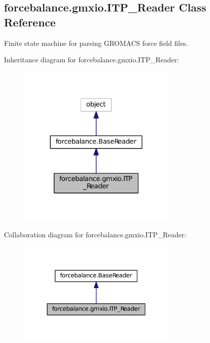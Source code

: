 \hypertarget{classforcebalance_1_1gmxio_1_1ITP__Reader}{\subsection{forcebalance.\-gmxio.\-I\-T\-P\-\_\-\-Reader Class Reference}
\label{classforcebalance_1_1gmxio_1_1ITP__Reader}
}


Finite state machine for parsing G\-R\-O\-M\-A\-C\-S force field files.  




Inheritance diagram for forcebalance.\-gmxio.\-I\-T\-P\-\_\-\-Reader\-:\nopagebreak
\begin{figure}[H]
\begin{center}
\leavevmode
\includegraphics[width=218pt]{classforcebalance_1_1gmxio_1_1ITP__Reader__inherit__graph}
\end{center}
\end{figure}


Collaboration diagram for forcebalance.\-gmxio.\-I\-T\-P\-\_\-\-Reader\-:\nopagebreak
\begin{figure}[H]
\begin{center}
\leavevmode
\includegraphics[width=218pt]{classforcebalance_1_1gmxio_1_1ITP__Reader__coll__graph}
\end{center}
\end{figure}
